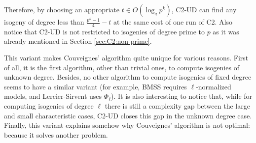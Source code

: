 Therefore, by choosing an appropriate $t\in O(\log_q p^k)$, C2-UD can
find any isogeny of degree less than $\frac{p^k-1}{4}-t$ at the same
cost of one run of C2. Also notice that C2-UD is not restricted to
isogenies of degree prime to $p$ as it was already mentioned in
Section \ref{sec:C2:non-prime}.

This variant makes Couveignes' algorithm quite unique for various
reasons. First of all, it is the first algorithm, other than trivial
ones, to compute isogenies of unknown degree. Besides, no other
algorithm to compute isogenies of fixed degree seems to have a similar
variant (for example, BMSS requires $\ell$-normalized models, and
Lercier-Sirvent uses $\Phi_\ell$). It is also interesting to notice
that, while for computing isogenies of degree $\ell$ there is still a
complexity gap between the large and small characteristic cases, C2-UD
closes this gap in the unknown degree case. Finally, this variant
explains somehow why Couveignes' algorithm is not optimal: because it
solves another problem.




%
